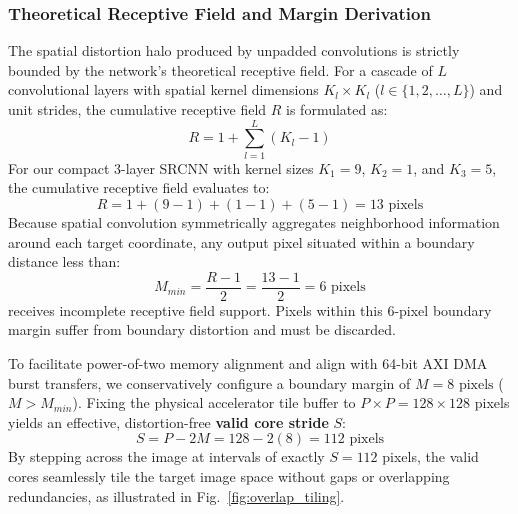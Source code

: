 \documentclass[conference]{IEEEtran}
\begin{document}
\subsubsection{Theoretical Receptive Field and Margin Derivation}
The spatial distortion halo produced by unpadded convolutions is strictly bounded by the network's theoretical receptive field. For a cascade of $L$ convolutional layers with spatial kernel dimensions $K_l \times K_l$ ($l \in \{1, 2, \dots, L\}$) and unit strides, the cumulative receptive field $R$ is formulated as:
\begin{equation}
R = 1 + \sum_{l=1}^L (K_l - 1)
\label{eq:receptive_field}
\end{equation}
For our compact 3-layer SRCNN with kernel sizes $K_1 = 9$, $K_2 = 1$, and $K_3 = 5$, the cumulative receptive field evaluates to:
\begin{equation}
R = 1 + (9 - 1) + (1 - 1) + (5 - 1) = 13\text{ pixels}
\label{eq:receptive_field_calc}
\end{equation}
Because spatial convolution symmetrically aggregates neighborhood information around each target coordinate, any output pixel situated within a boundary distance less than:
\begin{equation}
M_{min} = \frac{R - 1}{2} = \frac{13 - 1}{2} = 6\text{ pixels}
\label{eq:margin}
\end{equation}
receives incomplete receptive field support. Pixels within this $6$-pixel boundary margin suffer from boundary distortion and must be discarded.

To facilitate power-of-two memory alignment and align with 64-bit AXI DMA burst transfers, we conservatively configure a boundary margin of $M = 8\text{ pixels}$ ($M > M_{min}$). Fixing the physical accelerator tile buffer to $P \times P = 128 \times 128$ pixels yields an effective, distortion-free \textbf{valid core stride} $S$:
\begin{equation}
S = P - 2M = 128 - 2(8) = 112\text{ pixels}
\label{eq:stride}
\end{equation}
By stepping across the image at intervals of exactly $S = 112$ pixels, the valid cores seamlessly tile the target image space without gaps or overlapping redundancies, as illustrated in Fig.~\ref{fig:overlap_tiling}.
\end{document}
